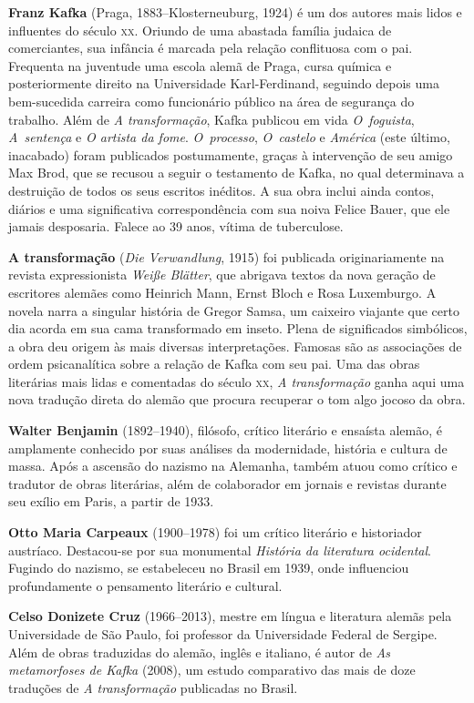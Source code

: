 \textbf{Franz Kafka} (Praga, 1883--Klosterneuburg, 1924) é um dos autores mais lidos 
e influentes do século \textsc{xx}. Oriundo de uma abastada família judaica de
comerciantes, sua infância é marcada pela relação conflituosa com o pai.
Frequenta na juventude uma escola alemã de Praga, cursa química e
posteriormente direito na Universidade Karl{}-Ferdinand, seguindo depois 
uma bem{}-sucedida carreira como funcionário público na área de segurança do trabalho. 
Além de \textit{A transformação}, Kafka publicou em vida \textit{O~foguista}, \textit{A~sentença} e \textit{O artista da fome}. \textit{O~processo}, \textit{O~castelo} e \textit{América} 
(este último, inacabado) foram publicados postumamente, graças à intervenção de 
seu amigo Max Brod, que se recusou a seguir o testamento de Kafka, no qual 
determinava a destruição de todos os seus escritos inéditos. A sua obra inclui
ainda contos, diários e uma significativa correspondência com sua noiva Felice
Bauer, que ele jamais desposaria. Falece ao 39 anos, vítima de tuberculose.

\textbf{A transformação} (\textit{Die Verwandlung}, 1915) foi publicada
originariamente na revista expressionista \textit{Weiße Blätter}, que abrigava
textos da nova geração de escritores alemães como Heinrich Mann, Ernst Bloch e
Rosa Luxemburgo. A novela narra a singular história de Gregor Samsa, um caixeiro
viajante que certo dia acorda em sua cama transformado em inseto. Plena de
significados simbólicos, a obra deu origem às mais diversas interpretações.
Famosas são as associações de ordem psicanalítica sobre a relação de Kafka 
com seu pai. Uma das obras literárias mais lidas e comentadas do século \textsc{xx}, \textit{A transformação} ganha aqui uma nova tradução direta do alemão que procura recuperar o tom algo jocoso da obra.
        
\textbf{Walter Benjamin} (1892--1940), filósofo, crítico literário e ensaísta alemão, é amplamente conhecido por suas análises da modernidade, história e cultura de massa. Após a ascensão do nazismo na Alemanha, também atuou como crítico e tradutor de obras literárias, além de colaborador em jornais e revistas durante seu exílio em Paris, a partir de 1933.

\textbf{Otto Maria Carpeaux} (1900--1978) foi um crítico literário e historiador austríaco. Destacou-se por sua monumental \textit{História da literatura ocidental}. Fugindo do nazismo, se estabeleceu no Brasil em 1939, onde influenciou profundamente o pensamento literário e cultural.

\textbf{Celso Donizete Cruz} (1966--2013), mestre em língua e literatura alemãs pela Universidade de São Paulo, foi professor da Universidade Federal de Sergipe. Além de obras traduzidas do alemão, inglês e italiano, é autor de \textit{As metamorfoses de Kafka} (2008), um estudo comparativo das mais de doze traduções de \textit{A transformação} publicadas no Brasil.

